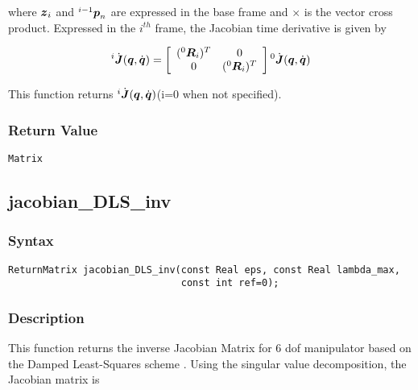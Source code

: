 \documentclass[dvips,11pt,fleqn]{report}
\newcommand{\mbold}[1]{\mbox{\boldmath $ #1 $}}
\begin{document}
where $\mbold{z}_i$ and $^{i-1}\mbold{p}_n$ are expressed in the base
frame and $\times$ is the vector cross product. Expressed in the
$i^{th}$ frame, the Jacobian time derivative is given by

\begin{eqnarray}
  ^i\dot{\mbold{J}}(\mbold{q},\dot{\mbold{q}}) =
  \left[
    \begin{array}{cc}
      (^0\mbold{R}_i)^T & 0 \\
      0 & (^0\mbold{R}_i)^T
    \end{array}
  \right] {^0}\dot{\mbold{J}}(\mbold{q},\dot{\mbold{q}})
\end{eqnarray}

This function returns $^i\dot{\mbold{J}}(\mbold{q},\dot{\mbold{q}})$(i=0 when not specified).

\subsubsection*{Return Value}

{\tt Matrix}
 \newpage 


\subsection*{jacobian\_DLS\_inv}
\subsubsection*{Syntax}
\begin{verbatim}
ReturnMatrix jacobian_DLS_inv(const Real eps, const Real lambda_max, 
                              const int ref=0);
\end{verbatim}

\subsubsection*{Description}   
This function returns the inverse Jacobian Matrix for 6 dof manipulator based on the Damped Least-Squares 
scheme \cite{Chiaverini94}. Using the singular value decomposition, the Jacobian matrix is
\end{document}
